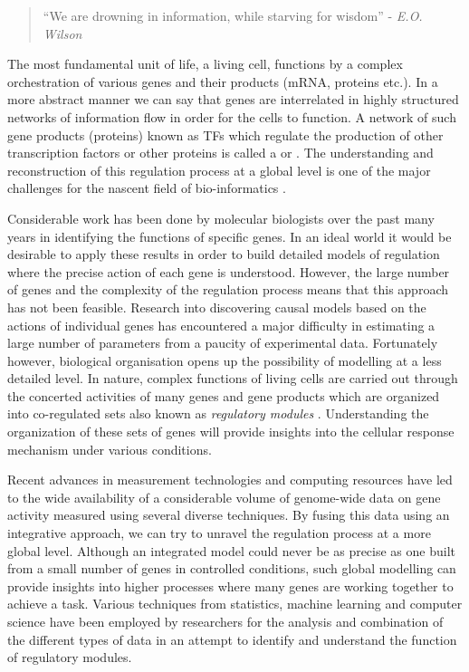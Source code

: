\begin{quote} ``We are drowning in information, while starving for wisdom'' - \textit{E.O. Wilson} \end{quote}

The most fundamental unit of life, a living cell, functions by a complex orchestration of various genes and their products (\acs{mRNA}, proteins etc.). In a more abstract manner we can say that genes are interrelated in highly structured networks of information flow in order for the cells to function. A network of such gene products (proteins) known as \acp{TF} which regulate the production of other transcription factors or other proteins is called a  or . The understanding and reconstruction of this regulation process at a global level is one of the major challenges for the nascent field of bio-informatics \citep{kernel_methodsvert2004}. 

Considerable work has been done by molecular biologists over the past many years in identifying the functions of specific genes. In an ideal world it would be desirable to apply these results in order to build detailed models of regulation where the precise action of each gene is understood. However, the large number of genes and the complexity of the regulation process means that this approach has not been feasible. Research into discovering causal models based on the actions of individual genes has encountered a major difficulty in estimating a large number of parameters from a paucity of experimental data. Fortunately however, biological organisation opens up the possibility of modelling at a less detailed level. In nature, complex functions of living cells are carried out through the concerted activities of many genes and gene products which are organized into co-regulated sets also known as \textit{regulatory modules} \citep{segal03module}. Understanding the organization of these sets of genes will provide insights into the cellular response mechanism under various conditions. 

Recent advances in measurement technologies and computing resources have led to the wide availability of a considerable volume of genome-wide data on gene activity measured using several diverse techniques. By fusing this data using an integrative approach, we can try to unravel the regulation process at a more global level. Although an integrated model could never be as precise as one built from a small number of genes in controlled conditions, such global modelling can provide insights into higher processes where many genes are working together to achieve a task. Various techniques from statistics, machine learning \citep{hastie01statisticallearning} and computer science have been employed by researchers for the analysis and combination of the different types of data in an attempt to identify and understand the function of regulatory modules. 


